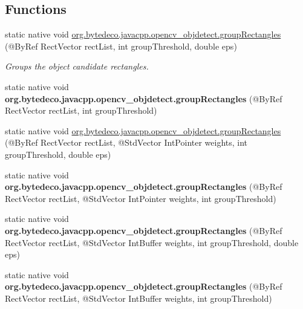 \subsection*{Functions}
\begin{DoxyCompactItemize}
\item 
static native void \hyperlink{group__objdetect_ga3036d2996cee06be22e0eccda95a671b}{org.\+bytedeco.\+javacpp.\+opencv\+\_\+objdetect.\+group\+Rectangles} (@By\+Ref Rect\+Vector rect\+List, int group\+Threshold, double eps)
\begin{DoxyCompactList}\small\item\em Groups the object candidate rectangles. \end{DoxyCompactList}\item 
\mbox{\label{group__objdetect_ga22ffd32f5bd5c63e8c5d5c3cca4ddc50}} 
static native void {\bfseries org.\+bytedeco.\+javacpp.\+opencv\+\_\+objdetect.\+group\+Rectangles} (@By\+Ref Rect\+Vector rect\+List, int group\+Threshold)
\item 
static native void \hyperlink{group__objdetect_gae1a108c813468189afc6756fdc5f4d33}{org.\+bytedeco.\+javacpp.\+opencv\+\_\+objdetect.\+group\+Rectangles} (@By\+Ref Rect\+Vector rect\+List, @Std\+Vector Int\+Pointer weights, int group\+Threshold, double eps)
\item 
\mbox{\label{group__objdetect_gaaa3d6925405b666f8c95a7ba2aa9383e}} 
static native void {\bfseries org.\+bytedeco.\+javacpp.\+opencv\+\_\+objdetect.\+group\+Rectangles} (@By\+Ref Rect\+Vector rect\+List, @Std\+Vector Int\+Pointer weights, int group\+Threshold)
\item 
\mbox{\label{group__objdetect_gaf31881c9b5ab511885ed9ea62ec18b3a}} 
static native void {\bfseries org.\+bytedeco.\+javacpp.\+opencv\+\_\+objdetect.\+group\+Rectangles} (@By\+Ref Rect\+Vector rect\+List, @Std\+Vector Int\+Buffer weights, int group\+Threshold, double eps)
\item 
\mbox{\label{group__objdetect_ga086aa4fbe23a55b60f81777233bfd713}} 
static native void {\bfseries org.\+bytedeco.\+javacpp.\+opencv\+\_\+objdetect.\+group\+Rectangles} (@By\+Ref Rect\+Vector rect\+List, @Std\+Vector Int\+Buffer weights, int group\+Threshold)
\item 
\mbox{\label{group__objdetect_gad3993c72ab7ed3a7878ecde021033996}} 

\end{DoxyCompactItemize}
